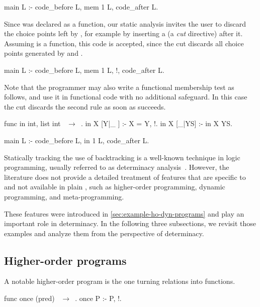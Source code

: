 \begin{elpicode}
main L :- code_before L, mem 1 L, code_after L.
\end{elpicode}
%
Since  was declared as a function, our static analysis invites the user
to discard the choice points left by , for example by inserting a
\eI{!} (a \emph{cut} directive)
after it. Assuming 
is a function, this code is accepted, since the cut discards all choice
points generated by  and .

\begin{elpicode}
main L :- code_before L, mem 1 L, !, code_after L. %
\end{elpicode}
%
Note that the programmer may also write a functional membership test as
follows, and use it in functional code with no additional safeguard. In this case
the cut discards the second rule as soon as  succeeds.
\begin{elpicode}
func in int, list int ~$\to$~.
in X [Y|_ ] :- X = Y, !. %
in X [_|YS] :- in X YS.

main L :- code_before L, in 1 L, code_after L. %
\end{elpicode}
%
Statically tracking the use of backtracking is a well-known technique in
logic programming, usually referred to as determinacy
analysis~\cite{warren1989,somogy1996}. However, the literature does not
provide a detailed treatment of features that are specific to \elpi and not
available in plain \prolog, such as higher-order programming, dynamic
programming, and meta-programming.

These features were introduced in
\cref{sec:example-ho-dyn-programs} and play an important role in
determinacy. In the following three subsections, we revisit those examples
and analyze them from the perspective of determinacy.


\subsection{Higher-order programs}
\label{sec:HO-program}

A notable higher-order program is the one turning relations into functions.
%
\begin{elpicode}
func once (pred) ~$\to$~. %
once P :- P, !.    ~$\;$~ %
\end{elpicode}


